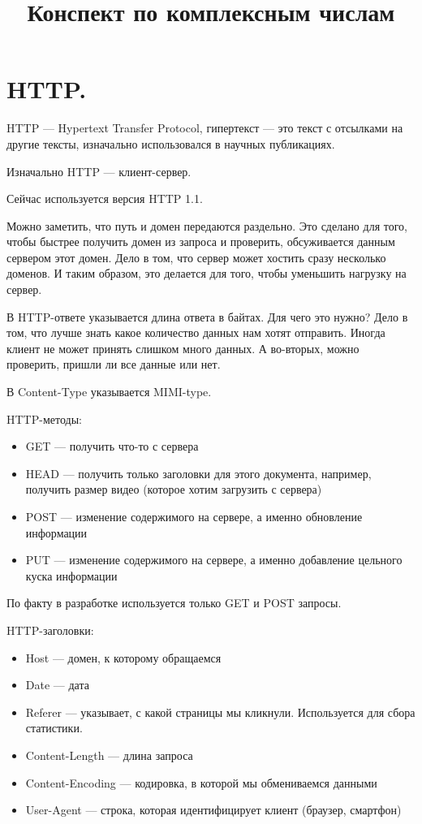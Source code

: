 \documentclass{article}
\title{Конспект по комплексным числам}
\begin{document}
\maketitle
\thispagestyle{fancy}
\section{HTTP.}
\df HTTP --- Hypertext Transfer Protocol, гипертекст --- это текст с отсылками на другие тексты, изначально использовался в научных публикациях.

Изначально HTTP --- клиент-сервер.

Сейчас используется версия HTTP 1.1.

Можно заметить, что путь и домен передаются раздельно. Это сделано для того, чтобы быстрее получить домен из запроса и проверить, обсуживается данным сервером этот домен. Дело в том, что сервер может хостить сразу несколько доменов. И таким образом, это делается для того, чтобы уменьшить нагрузку на сервер.

В HTTP-ответе указывается длина ответа в байтах. Для чего это нужно? Дело в том, что лучше знать какое количество данных нам хотят отправить. Иногда клиент не может принять слишком много данных. А во-вторых, можно проверить, пришли ли все данные или нет.

В Content-Type указывается MIMI-type.

HTTP-методы:
\begin{itemize}
	\item GET --- получить что-то с сервера
	\item HEAD --- получить только заголовки для этого документа, например, получить размер видео (которое хотим загрузить с сервера)
	\item POST --- изменение содержимого на сервере, а именно обновление информации
	\item PUT --- изменение содержимого на сервере, а именно добавление цельного куска информации
\end{itemize}
По факту в разработке используется только GET и POST запросы.

HTTP-заголовки:
\begin{itemize}
	\item Host --- домен, к которому обращаемся
	\item Date --- дата
	\item Referer --- указывает, с какой страницы мы кликнули. Используется для сбора статистики.
	\item Content-Length --- длина запроса
	\item Content-Encoding --- кодировка, в которой мы обмениваемся данными
	\item User-Agent --- строка, которая идентифицирует клиент (браузер, смартфон)
\end{itemize}
\end{document}
